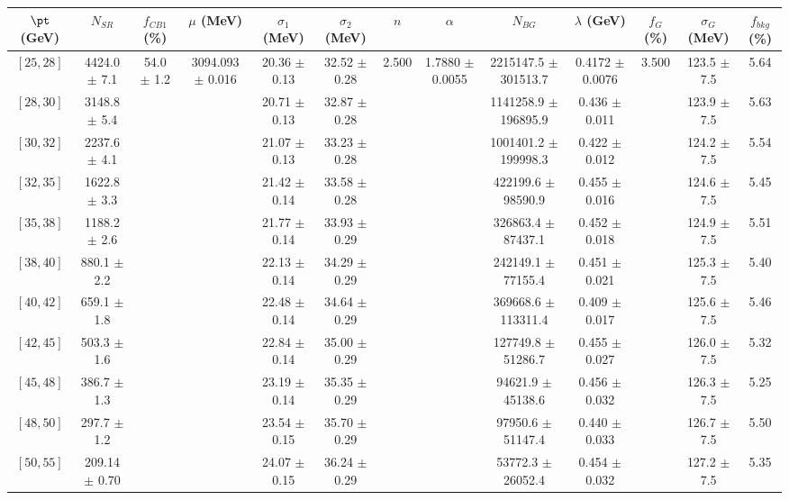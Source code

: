 \begin{tabular}{c||c|c|c|c|c|c|c|c|c|c|c||c}
$\pt$ (GeV) & $N_{SR}$ & $f_{CB1}$ (\%) & $\mu$ (MeV) & $\sigma_1$ (MeV) & $\sigma_2$ (MeV) & $n$ & $\alpha$ & $N_{BG}$ & $\lambda$ (GeV) & $f_G$ (\%) & $\sigma_G$ (MeV) & $f_{bkg}$ (\%) \\
\hline
$[25, 28]$ & 4424.0 $\pm$ 7.1 & \multirow{19}{*}{54.0 $\pm$ 1.2} & \multirow{19}{*}{3094.093 $\pm$ 0.016} & 20.36 $\pm$ 0.13 & 32.52 $\pm$ 0.28 & \multirow{19}{*}{2.500} & \multirow{19}{*}{1.7880 $\pm$ 0.0055} & 2215147.5 $\pm$ 301513.7 & 0.4172 $\pm$ 0.0076 & \multirow{19}{*}{3.500} & 123.5 $\pm$ 7.5 & 5.64\\
$[28, 30]$ & 3148.8 $\pm$ 5.4 &  &  & 20.71 $\pm$ 0.13 & 32.87 $\pm$ 0.28 &  &  & 1141258.9 $\pm$ 196895.9 & 0.436 $\pm$ 0.011 &  & 123.9 $\pm$ 7.5 & 5.63\\
$[30, 32]$ & 2237.6 $\pm$ 4.1 &  &  & 21.07 $\pm$ 0.13 & 33.23 $\pm$ 0.28 &  &  & 1001401.2 $\pm$ 199998.3 & 0.422 $\pm$ 0.012 &  & 124.2 $\pm$ 7.5 & 5.54\\
$[32, 35]$ & 1622.8 $\pm$ 3.3 &  &  & 21.42 $\pm$ 0.14 & 33.58 $\pm$ 0.28 &  &  & 422199.6 $\pm$ 98590.9 & 0.455 $\pm$ 0.016 &  & 124.6 $\pm$ 7.5 & 5.45\\
$[35, 38]$ & 1188.2 $\pm$ 2.6 &  &  & 21.77 $\pm$ 0.14 & 33.93 $\pm$ 0.29 &  &  & 326863.4 $\pm$ 87437.1 & 0.452 $\pm$ 0.018 &  & 124.9 $\pm$ 7.5 & 5.51\\
$[38, 40]$ & 880.1 $\pm$ 2.2 &  &  & 22.13 $\pm$ 0.14 & 34.29 $\pm$ 0.29 &  &  & 242149.1 $\pm$ 77155.4 & 0.451 $\pm$ 0.021 &  & 125.3 $\pm$ 7.5 & 5.40\\
$[40, 42]$ & 659.1 $\pm$ 1.8 &  &  & 22.48 $\pm$ 0.14 & 34.64 $\pm$ 0.29 &  &  & 369668.6 $\pm$ 113311.4 & 0.409 $\pm$ 0.017 &  & 125.6 $\pm$ 7.5 & 5.46\\
$[42, 45]$ & 503.3 $\pm$ 1.6 &  &  & 22.84 $\pm$ 0.14 & 35.00 $\pm$ 0.29 &  &  & 127749.8 $\pm$ 51286.7 & 0.455 $\pm$ 0.027 &  & 126.0 $\pm$ 7.5 & 5.32\\
$[45, 48]$ & 386.7 $\pm$ 1.3 &  &  & 23.19 $\pm$ 0.14 & 35.35 $\pm$ 0.29 &  &  & 94621.9 $\pm$ 45138.6 & 0.456 $\pm$ 0.032 &  & 126.3 $\pm$ 7.5 & 5.25\\
$[48, 50]$ & 297.7 $\pm$ 1.2 &  &  & 23.54 $\pm$ 0.15 & 35.70 $\pm$ 0.29 &  &  & 97950.6 $\pm$ 51147.4 & 0.440 $\pm$ 0.033 &  & 126.7 $\pm$ 7.5 & 5.50\\
$[50, 55]$ & 209.14 $\pm$ 0.70 &  &  & 24.07 $\pm$ 0.15 & 36.24 $\pm$ 0.29 &  &  & 53772.3 $\pm$ 26052.4 & 0.454 $\pm$ 0.032 &  & 127.2 $\pm$ 7.5 & 5.35\\

\end{tabular}

